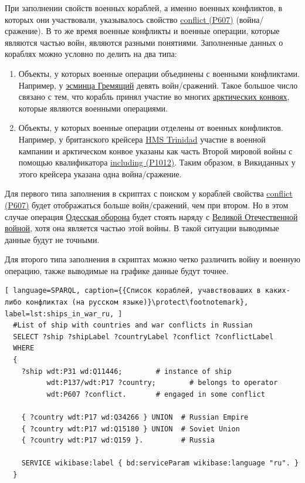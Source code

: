 При заполнении свойств военных кораблей, а именно военных конфликтов, в которых они участвовали, указывалось свойство \href{https://www.wikidata.org/wiki/Property:P607}{conflict (P607)} (война/сражение). В то же время военные конфликты и военные операции, которые являются частью войн, являются разными понятиями. Заполненные данных о кораблях можно условно по делить на два типа:

\begin{enumerate}
  \item Объекты, у которых военные операции объединены с военными конфликтами. Например, у \href{https://www.wikidata.org/wiki/Q4148613}{эсминца Гремящий} девять войн/сражений. Такое большое число связано с тем, что корабль принял участие во многих \href{https://ru.wikipedia.org/wiki/Арктические_конвои}{арктических конвоях}, которые являются военными операциями.
  \item Объекты, у которых военные операции отделены от военных конфликтов. Например, у британского крейсера \href{https://ru.wikipedia.org/wiki/HMS_Trinidad_(1940)}{HMS Trinidad} участие в военной кампании и арктическом конвое указаны как часть Второй мировой войны с помощью квалификатора \href{https://www.wikidata.org/wiki/Property:P1012}{including (P1012)}. Таким образом, в Викиданных у этого крейсера указана одна война/сражение.
\end{enumerate}

Для первого типа заполнения в скриптах с поиском у кораблей свойства \href{https://www.wikidata.org/wiki/Property:P607}{conflict (P607)} будет отображаться больше войн/сражений, чем при втором. Но в этом случае операция \href{https://ru.wikipedia.org/wiki/Одесская_оборона_(1941)}{Одесская оборона} будет стоять наряду с \href{https://ru.wikipedia.org/wiki/Великая_Отечественная_война}{Великой Отечественной войной}, хотя она является частью этой войны. В такой ситуации выводимые данные будут не точными.

Для второго типа заполнения в скриптах можно четко различить войну и военную операцию, также выводимые на графике данные будут точнее.


\begin{lstlisting}[ language=SPARQL, caption={{Список кораблей, учавствоваших в каких-либо конфликтах (на русском языке)}\protect\footnotemark}, label=lst:ships_in_war_ru, ]
  #List of ship with countries and war conflicts in Russian
  SELECT ?ship ?shipLabel ?countryLabel ?conflict ?conflictLabel
  WHERE
  {
    ?ship wdt:P31 wd:Q11446;        # instance of ship
          wdt:P137/wdt:P17 ?country;        # belongs to operator
          wdt:P607 ?conflict.       # engaged in some conflict
    
    { ?country wdt:P17 wd:Q34266 } UNION  # Russian Empire
    { ?country wdt:P17 wd:Q15180 } UNION  # Soviet Union
    { ?country wdt:P17 wd:Q159 }.         # Russia
    
    SERVICE wikibase:label { bd:serviceParam wikibase:language "ru". }
  }
\end{lstlisting}



